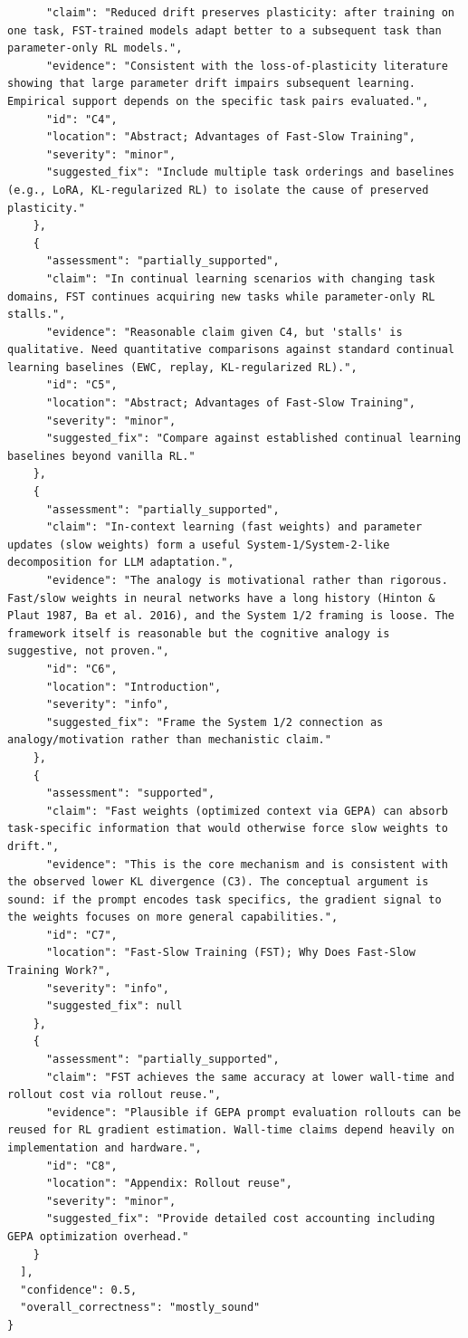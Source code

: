 \documentclass[11pt]{article}
\begin{document}
\begin{verbatim}
      "claim": "Reduced drift preserves plasticity: after training on one task, FST-trained models adapt better to a subsequent task than parameter-only RL models.",
      "evidence": "Consistent with the loss-of-plasticity literature showing that large parameter drift impairs subsequent learning. Empirical support depends on the specific task pairs evaluated.",
      "id": "C4",
      "location": "Abstract; Advantages of Fast-Slow Training",
      "severity": "minor",
      "suggested_fix": "Include multiple task orderings and baselines (e.g., LoRA, KL-regularized RL) to isolate the cause of preserved plasticity."
    },
    {
      "assessment": "partially_supported",
      "claim": "In continual learning scenarios with changing task domains, FST continues acquiring new tasks while parameter-only RL stalls.",
      "evidence": "Reasonable claim given C4, but 'stalls' is qualitative. Need quantitative comparisons against standard continual learning baselines (EWC, replay, KL-regularized RL).",
      "id": "C5",
      "location": "Abstract; Advantages of Fast-Slow Training",
      "severity": "minor",
      "suggested_fix": "Compare against established continual learning baselines beyond vanilla RL."
    },
    {
      "assessment": "partially_supported",
      "claim": "In-context learning (fast weights) and parameter updates (slow weights) form a useful System-1/System-2-like decomposition for LLM adaptation.",
      "evidence": "The analogy is motivational rather than rigorous. Fast/slow weights in neural networks have a long history (Hinton & Plaut 1987, Ba et al. 2016), and the System 1/2 framing is loose. The framework itself is reasonable but the cognitive analogy is suggestive, not proven.",
      "id": "C6",
      "location": "Introduction",
      "severity": "info",
      "suggested_fix": "Frame the System 1/2 connection as analogy/motivation rather than mechanistic claim."
    },
    {
      "assessment": "supported",
      "claim": "Fast weights (optimized context via GEPA) can absorb task-specific information that would otherwise force slow weights to drift.",
      "evidence": "This is the core mechanism and is consistent with the observed lower KL divergence (C3). The conceptual argument is sound: if the prompt encodes task specifics, the gradient signal to the weights focuses on more general capabilities.",
      "id": "C7",
      "location": "Fast-Slow Training (FST); Why Does Fast-Slow Training Work?",
      "severity": "info",
      "suggested_fix": null
    },
    {
      "assessment": "partially_supported",
      "claim": "FST achieves the same accuracy at lower wall-time and rollout cost via rollout reuse.",
      "evidence": "Plausible if GEPA prompt evaluation rollouts can be reused for RL gradient estimation. Wall-time claims depend heavily on implementation and hardware.",
      "id": "C8",
      "location": "Appendix: Rollout reuse",
      "severity": "minor",
      "suggested_fix": "Provide detailed cost accounting including GEPA optimization overhead."
    }
  ],
  "confidence": 0.5,
  "overall_correctness": "mostly_sound"
}
\end{verbatim}
\end{document}
